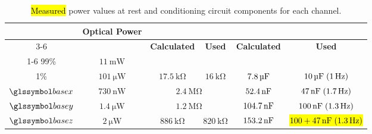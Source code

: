 \documentclass[sensors,article,accept,pdftex,moreauthors]{Definitions/mdpi}
\begin{document}
\begin{table}[H]
\setlength{\tabcolsep}{2.8mm}
	\caption{\hl{Measured} %
 power values at rest and conditioning circuit components for each channel.\protect\label{tab:-2}}

	\centering{}%
	\begin{tabular}{cccccc}
		\toprule
		                    & \multirow{2}{*}{\textbf{Optical Power}\vspace{-6pt}} & \multicolumn{2}{c}{\boldmath{$\resistorTransimpedancia$} }& \multicolumn{2}{c}{\boldmath{$\capacitorFiltroPassaBaixa$}}                                                                                                       \\
		\cmidrule{3-6}
		                    &                                & \textbf{Calculated}                                     & \textbf{Used}                                             & \textbf{Calculated}                                   & \textbf{Used} \boldmath{$\left(\frequenciaCorteFiltroPassaBaixa\right)$ }\\
		\cmidrule{1-6}
		{99}{\%} & $\SI{11}{\mW}$                 &                                                &                                                  &                                              &                                                      \\
		{1}{\%}  & $\SI{101}{\uW}$                & $\SI{17,5}{\kohm}$                             & $\SI{16}{\kohm}$                                 & $\SI{7,8}{\uF}$                              & $\SI{10}{\uF}\;\left(\SI{1}{\hertz}\right)$            \\
		$\basex$            & $\SI{730}{\nano\watt}$         & \multicolumn{2}{c}{$\SI{2,4}{\Mohm}$}          & $\SI{52,4}{\nF}$                                 & $\SI{47}{\nF}\;\left(\SI{1.7}{\hertz}\right)$                                                         \\
		$\basey$            & $\SI{1,4}{\uW}$                & \multicolumn{2}{c}{$\SI{1,2}{\Mohm}$}          & $\SI{104,7}{\nF}$                                & $\SI{100}{\nF}\;\left(\SI{1.3}{\hertz}\right)$                                                        \\
		$\basez$            & $\SI{2}{\uW}$                  & $\SI{886}{\kohm}$                              & $\SI{820}{\kohm}$                                & $\SI{153,2}{\nF}$                            & \hl{$100+\SI{47}{\nF}\;\left(\SI{1.3}{\hertz}\right)$} %
      \\
		\bottomrule
	\end{tabular}

\end{table}
\end{document}
